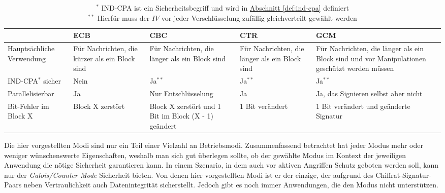 \begin{table}[h]
\centering
	\begin{tabularx}{\textwidth}{ | X | X | X | X | X |} 
		\hline
		  & ECB & CBC & CTR & GCM \\ 
		\hline
		Hauptsächliche Verwendung & Für Nachrichten, die kürzer als ein Block sind & Für Nachrichten, die länger als ein Block sind 
		& Für Nachrichten, die länger als ein Block sind & Für Nachrichten, die länger als ein Block sind und vor Manipulationen geschützt werden müssen \\ 
		\hline
		\parbox{3cm}{IND-CPA\(^{\ast}\) } sicher & Nein & Ja\(^{\ast\ast}\) & Ja\(^{\ast\ast}\) & Ja\(^{\ast\ast}\) \\
		\hline
		 Parallelisierbar & Ja & Nur Entschlüsselung  & Ja & Ja, das Signieren selbst aber nicht \\ 
		\hline
		Bit-Fehler im Block X & Block X zerstört & Block X zerstört und 1 Bit im Block (X - 1) geändert 
		& 1 Bit verändert & 1 Bit verändert und geänderte Signatur \\
		\hline
	\end{tabularx}
	\caption{\(^{\ast}\) IND-CPA ist ein Sicherheitsbegriff und wird in \hyperref[def:ind-cpa]{Abschnitt \ref{def:ind-cpa}} definiert \\ 
		\(^{\ast\ast}\) Hierfür muss der \(IV\) vor jeder Verschlüsselung zufällig gleichverteilt gewählt werden}
\end{table}

\captionsetup[table]{labelformat=default}
\captionsetup[table]{singlelinecheck=true}
\captionsetup{font=normal}
 
\bigskip

Die hier vorgestellten Modi sind nur ein Teil einer Vielzahl an Betriebsmodi. Zusammenfassend betrachtet hat jeder Modus mehr oder weniger wünschenswerte Eigenschaften, weshalb man sich gut überlegen sollte, ob der gewählte Modus im Kontext der jeweiligen Anwendung die nötige Sicherheit garantieren kann. In einem Szenario, in dem auch vor aktiven Angriffen Schutz geboten werden soll,
kann nur der \textit{Galois/Counter Mode} Sicherheit bieten. Von denen hier vorgestellten Modi ist er der einzige, der aufgrund des Chiffrat-Signatur-Paars neben Vertraulichkeit auch Datenintegrität sicherstellt. Jedoch gibt es noch immer Anwendungen, die den Modus
nicht unterstützen.